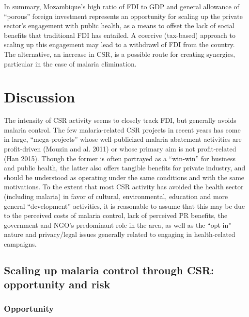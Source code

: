 \documentclass[]{article}
\begin{document}
In summary, Mozambique's high ratio of FDI to GDP and general allowance
of ``porous'' foreign investment represents an opportunity for scaling
up the private sector's engagement with public health, as a means to
offset the lack of social benefits that traditional FDI has entailed. A
coercive (tax-based) approach to scaling up this engagement may lead to
a withdrawl of FDI from the country. The alternative, an increase in
CSR, is a possible route for creating synergies, particular in the case
of malaria elimination.

\section{Discussion}\label{discussion}

The intensity of CSR activity seems to closely track FDI, but generally
avoids malaria control. The few malaria-related CSR projects in recent
years has come in large, ``mega-projects'' whose well-publicized malaria
abatement activities are profit-driven (Mouzin and al. 2011) or whose
primary aim is not profit-related (Han 2015). Though the former is often
portrayed as a ``win-win'' for business and public health, the latter
also offers tangible benefits for private industry, and should be
understood as operating under the same conditions and with the same
motivations. To the extent that most CSR activity has avoided the health
sector (including malaria) in favor of cultural, environmental,
education and more general ``development'' activities, it is reasonable
to assume that this may be due to the perceived costs of malaria
control, lack of perceived PR benefits, the government and NGO's
predominant role in the area, as well as the ``opt-in'' nature and
privacy/legal issues generally related to engaging in health-related
campaigns.

\subsection{Scaling up malaria control through CSR: opportunity and
risk}\label{scaling-up-malaria-control-through-csr-opportunity-and-risk}

\subsubsection{Opportunity}\label{opportunity}
\end{document}
